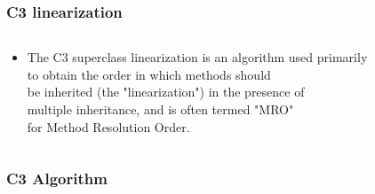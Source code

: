 \documentclass{beamer}
\begin{document}
\begin{frame}
	\frametitle{C3 linearization}
	\begin{columns}[c]
		\begin{column}{30cm}
			\vspace{.1cm}
			\begin{itemize}
					\justifying
					\item The C3 superclass linearization is an algorithm used primarily \\
					to obtain the order in which methods should \\
					be inherited (the "linearization") in the presence of \\
					multiple inheritance, and is often termed "MRO" \\
					for Method Resolution Order.	
			\end{itemize}		
		\end{column}
	\end{columns}
\end{frame}

\begin{frame}[fragile]
	\frametitle{C3 Algorithm}
	\begin{columns}[c]
		\begin{column}{30cm}
			\vspace{.05cm}
		\end{column}
	\end{columns}
\end{frame}
\end{document}
